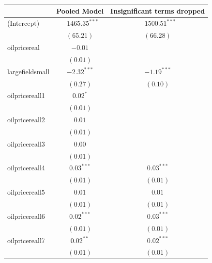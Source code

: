 \documentclass[12pt]{article}
\begin{document}
\begin{table}
\begin{center}
\begin{tabular}{l c c }
\hline
                                     & Pooled Model & Insignificant terms dropped \\
\hline
(Intercept)                          & $-1465.35^{***}$ & $-1500.51^{***}$ \\
                                     & $(65.21)$        & $(66.28)$        \\
oilpricereal                       & $-0.01$          &                  \\
                                     & $(0.01)$         &                  \\
largefieldsmall                     & $-2.32^{***}$    & $-1.19^{***}$    \\
                                     & $(0.27)$         & $(0.10)$         \\
oilpricereall1                    & $0.02^{*}$       &                  \\
                                     & $(0.01)$         &                  \\
oilpricereall2                    & $0.01$           &                  \\
                                     & $(0.01)$         &                  \\
oilpricereall3                    & $0.00$           &                  \\
                                     & $(0.01)$         &                  \\
oilpricereall4                    & $0.03^{***}$     & $0.03^{***}$     \\
                                     & $(0.01)$         & $(0.01)$         \\
oilpricereall5                    & $0.01$           & $0.01$           \\
                                     & $(0.01)$         & $(0.01)$         \\
oilpricereall6                    & $0.02^{***}$     & $0.03^{***}$     \\
                                     & $(0.01)$         & $(0.01)$         \\
oilpricereall7                    & $0.02^{**}$      & $0.02^{***}$     \\
                                     & $(0.01)$         & $(0.01)$         \\

\end{tabular}
\end{center}
\end{table}
\end{document}
